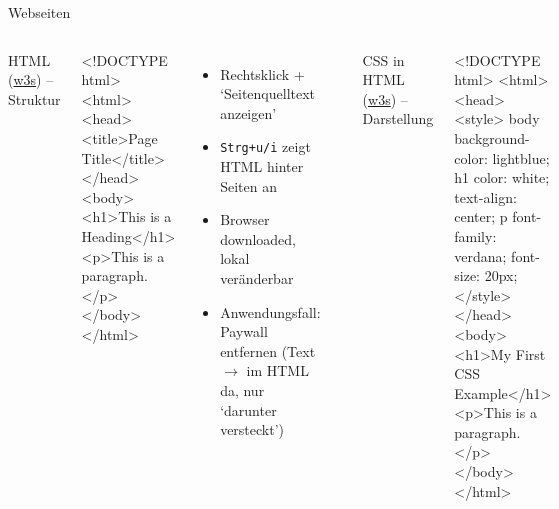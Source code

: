 \begin{frame}[fragile]{Webseiten}
  \begin{columns}[T,onlytextwidth]
    HTML (\href{https://www.w3schools.com/html/default.asp}{w3s}) -- Struktur
\begin{htmlcode}
<!DOCTYPE html>
<html>
 <head>
   <title>Page Title</title>
 </head>
 <body>
  <h1>This is a Heading</h1>
  <p>This is a paragraph.</p>
 </body>
</html>
\end{htmlcode}

      \begin{itemize}\scriptsize
          \item Rechtsklick + `Seitenquelltext anzeigen'
          \item \texttt{Strg+u/i} zeigt HTML hinter Seiten an
          \item Browser downloaded, lokal veränderbar
          \item Anwendungsfall: Paywall entfernen \tiny(Text $\to$ im HTML da, nur `darunter versteckt')
      \end{itemize}
      
      \begin{block}{}
        \includegraphics[width=0.97\textwidth]{img/css-example.png}
      \end{block}
      

CSS in HTML (\href{https://www.w3schools.com/css/default.asp}{w3s}) -- Darstellung
\begin{htmlcode}
<!DOCTYPE html>
<html>
  <head>
    <style>
body {
  background-color: lightblue;
}
h1 {
  color: white;
  text-align: center;
}
p {
  font-family: verdana;
  font-size: 20px;
}
    </style>
  </head>
  <body>
    <h1>My First CSS Example</h1>
    <p>This is a paragraph.</p>
  </body>
</html>
\end{htmlcode}

  \end{columns}
\end{frame}


